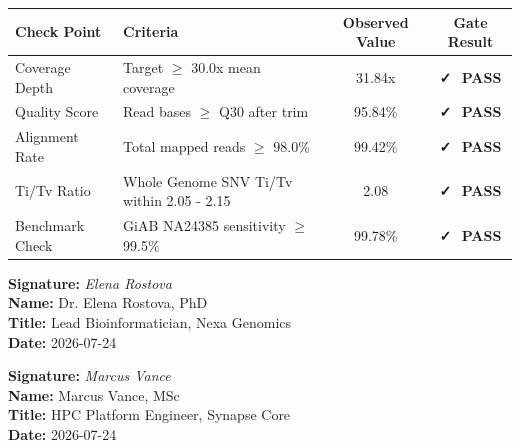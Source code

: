 \documentclass[10pt,a4paper]{article}
\begin{document}
\begin{tcolorbox}[cardstyle]
  \scriptsize
  \begin{tabularx}{\textwidth}{@{}l X c c@{}}
    \textbf{Check Point} & \textbf{Criteria} & \textbf{Observed Value} & \textbf{Gate Result} \\
    \midrule
    Coverage Depth & Target $\ge$ 30.0x mean coverage & 31.84x & \textcolor{StatusGreen}{\textbf{\faCheck~\,PASS}} \\{}
    Quality Score & Read bases $\ge$ Q30 after trim & 95.84\% & \textcolor{StatusGreen}{\textbf{\faCheck~\,PASS}} \\{}
    Alignment Rate & Total mapped reads $\ge$ 98.0\% & 99.42\% & \textcolor{StatusGreen}{\textbf{\faCheck~\,PASS}} \\{}
    Ti/Tv Ratio & Whole Genome SNV Ti/Tv within 2.05 - 2.15 & 2.08 & \textcolor{StatusGreen}{\textbf{\faCheck~\,PASS}} \\{}
    Benchmark Check & GiAB NA24385 sensitivity $\ge$ 99.5\% & 99.78\% & \textcolor{StatusGreen}{\textbf{\faCheck~\,PASS}} \\
  \end{tabularx}
\end{tcolorbox}

\vspace{6pt}

\noindent
\begin{minipage}[t]{0.49\textwidth}
  \begin{tcolorbox}[cardstyle, title={\color{NavyDark}\scriptsize\bfseries Lead Bioinformatician Validation}]
    \vspace{4pt}
    \scriptsize
    \textbf{Signature:} \textit{Elena Rostova} \\[3pt]
    \textbf{Name:} Dr. Elena Rostova, PhD \\
    \textbf{Title:} Lead Bioinformatician, Nexa Genomics \\
    \textbf{Date:} 2026-07-24
  \end{tcolorbox}
\end{minipage}%
\hfill
\begin{minipage}[t]{0.49\textwidth}
  \begin{tcolorbox}[cardstyle, title={\color{NavyDark}\scriptsize\bfseries Infrastructure Quality Control}]
    \vspace{4pt}
    \scriptsize
    \textbf{Signature:} \textit{Marcus Vance} \\[3pt]
    \textbf{Name:} Marcus Vance, MSc \\
    \textbf{Title:} HPC Platform Engineer, Synapse Core \\
    \textbf{Date:} 2026-07-24
  \end{tcolorbox}
\end{minipage}
\end{document}
